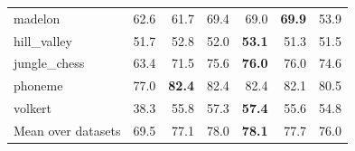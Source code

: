 \documentclass[pdflatex,sn-mathphys]{sn-jnl}
\theoremstyle{thmstyleone}
\begin{document}
\begin{table}[htbp]
\begin{tabular}{@{}lrrrrrr@{}}
madelon & 62.6 & 61.7 & 69.4 & 69.0 & \textbf{69.9} & 53.9 \\
hill\_valley & 51.7 & 52.8 & 52.0 & \textbf{53.1} & 51.3 & 51.5 \\
jungle\_chess & 63.4 & 71.5 & 75.6 & \textbf{76.0} & 76.0 & 74.6 \\
phoneme & 77.0 & \textbf{82.4} & 82.4 & 82.4 & 82.1 & 80.5 \\
volkert & 38.3 & 55.8 & 57.3 & \textbf{57.4} & 55.6 & 54.8 \\
\midrule
Mean over datasets & 69.5 & 77.1 & 78.0 & \textbf{78.1} & 77.7 & 76.0 \\
\bottomrule
\end{tabular}
\end{table}

\clearpage
\end{document}
